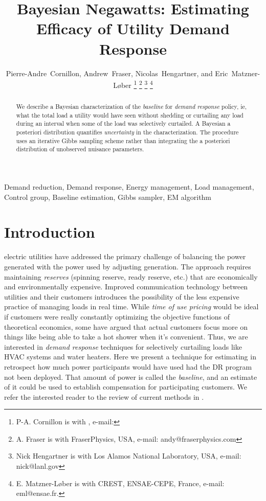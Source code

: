 \documentclass[journal]{IEEEtran}
\begin{document}
\title{Bayesian Negawatts: Estimating Efficacy of Utility Demand Response}

\author{
  Pierre-Andre~Cornillon,
  Andrew~Fraser,
  Nicolas~Hengartner,
  and Eric~Matzner-L{\o}ber
\thanks{P-A. Cornillon is with , e-mail: }%
\thanks{A. Fraser is with FraserPhysics, USA, e-mail: andy@fraserphysics.com}%
\thanks{Nick Hengartner is with Los Alamos National Laboratory, USA,
  e-mail: nick@lanl.gov}%
\thanks{E. Matzner-L{\o}ber is with CREST, ENSAE-CEPE, France,
  e-mail: eml@ensae.fr.}
}
\maketitle

\begin{abstract}
  We describe a Bayesian characterization of the \emph{baseline} for
  \emph{demand response} policy, ie, what the total load a utility
  would have seen without shedding or curtailing any load during an
  interval when some of the load was selectively curtailed.  A
  Bayesian a posteriori distribution quantifies \emph{uncertainty} in
  the characterization.  The procedure uses an iterative Gibbs
  sampling scheme rather than integrating the a posteriori
  distribution of unobserved nuisance parameters.
\end{abstract}

\begin{IEEEkeywords}
Demand reduction, Demand response, Energy management, Load management,
Control group, Baseline estimation, Gibbs sampler, EM algorithm
\end{IEEEkeywords}

\IEEEpeerreviewmaketitle

\section{Introduction}
\label{sec:intro}

 electric utilities have addressed the
primary challenge of balancing the power generated with the power used
by adjusting generation.  The approach requires maintaining
\emph{reserves} (spinning reserve, ready reserve, etc.) that are
economically and environmentally expensive.  Improved communication
technology between utilities and their customers introduces the
possibility of the less expensive practice of managing loads in real
time.  While \emph{time of use pricing} would be ideal if customers
were really constantly optimizing the objective functions of
theoretical economics, some have argued\cite{meyn} that actual
customers focus more on things like being able to take a hot shower
when it's convenient.  Thus, we are interested in \emph{demand
  response} techniques for selectively curtailing loads like HVAC
systems and water heaters.  Here we present a technique for estimating
in retrospect how much power participants would have used had the DR
program not been deployed.  That amount of power is called the
\emph{baseline}, and an estimate of it could be used to establish
compensation for participating customers.  We refer the interested
reader to the review of current methods in \cite{directestimation}.
\end{document}
